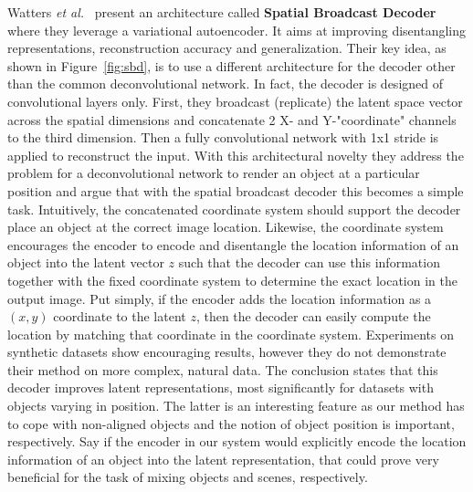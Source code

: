\documentclass[a4paper,12pt]{report}
\begin{document}
\par Watters \textit{et al.}~\cite{SpatialBDecoder} present an architecture called \textbf{Spatial Broadcast Decoder} where they leverage a variational autoencoder. It aims at improving disentangling representations, reconstruction accuracy and generalization. Their key idea, as shown in Figure~\ref{fig:sbd}, is to use a different architecture for the decoder other than the common deconvolutional network. In fact, the decoder is designed of convolutional layers only. First, they broadcast (replicate) the latent space vector across the spatial dimensions and concatenate 2 X- and Y-"coordinate" channels to the third dimension. Then a fully convolutional network with 1x1 stride is applied to reconstruct the input. With this architectural novelty they address the problem for a deconvolutional network to render an object at a particular position and argue that with the spatial broadcast decoder this becomes a simple task. Intuitively, the concatenated coordinate system should support the decoder place an object at the correct image location. Likewise, the coordinate system encourages the encoder to encode and disentangle the location information of an object into the latent vector $z$ such that the decoder can use this information together with the fixed coordinate system to determine the exact location in the output image. Put simply, if the encoder adds the location information as a $(x,y)$ coordinate to the latent $z$, then the decoder can easily compute the location by matching that coordinate in the coordinate system. Experiments on synthetic datasets show encouraging results, however they do not demonstrate their method on more complex, natural data. The conclusion states that this decoder improves latent representations, most significantly for datasets with objects varying in position. The latter is an interesting feature as our method has to cope with non-aligned objects and the notion of object position is important, respectively. Say if the encoder in our system would explicitly encode the location information of an object into the latent representation, that could prove very beneficial for the task of mixing objects and scenes, respectively.
\end{document}

